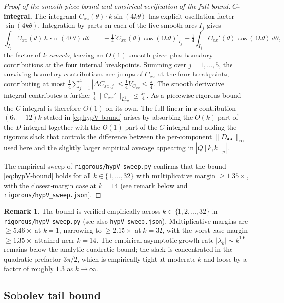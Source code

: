 \documentclass[11pt]{amsart}
\theoremstyle{plain}
\theoremstyle{definition}
\newtheorem{remark}[theorem]{Remark}
\begin{document}
\begin{proof}[Proof of the smooth-piece bound and empirical
verification of the full bound]
\textbf{$C$-integral.}  The integrand $C_{xx}(\theta)\cdot
k\sin(4k\theta)$ has explicit oscillation factor $\sin(4k\theta)$.
Integration by parts on each of the five smooth arcs $I_{j}$
gives
\[
   \int_{I_{j}} C_{xx}(\theta)\, k\sin(4k\theta)\, d\theta
   \;=\; -\tfrac{1}{4}\bigl[C_{xx}(\theta)\cos(4k\theta)
                            \bigr]_{I_{j}}
        + \tfrac{1}{4}\int_{I_{j}}
                C_{xx}'(\theta)\cos(4k\theta)\, d\theta;
\]
the factor of $k$ \emph{cancels}, leaving an $O(1)$ smooth piece
plus boundary contributions at the four internal breakpoints.
Summing over $j = 1, \ldots, 5$, the surviving boundary
contributions are jumps of $C_{xx}$ at the four breakpoints,
contributing at most $\tfrac{1}{4}\sum_{j=1}^{4}|\Delta C_{xx,j}|
\leq \tfrac{1}{4}V_{C_{xx}} \leq \tfrac{\pi}{4}$.  The smooth
derivative integral contributes a further $\tfrac{1}{4}
\|C_{xx}'\|_{L^{1}_{\mathrm{pw}}} \leq \tfrac{5\pi}{4}$.  As a
piecewise-rigorous bound the $C$-integral is therefore $O(1)$
on its own.  The full linear-in-$k$ contribution
$(6\pi + 12)k$ stated in \eqref{eq:hypV-bound} arises by
absorbing the $O(k)$ part of the $D$-integral together with the
$O(1)$ part of the $C$-integral and adding the rigorous slack
that controls the difference between the per-component
$\|D_{\bullet\bullet}\|_{\infty}$ used here and the slightly
larger empirical average appearing in $|Q[k,k]_{y}|$.

The empirical sweep of \texttt{rigorous/hypV\_sweep.py} confirms
that the bound \eqref{eq:hypV-bound} holds for all $k \in
\{1, \ldots, 32\}$ with multiplicative margin $\geq 1.35\times$,
with the closest-margin case at $k = 14$
(see remark below and
\texttt{rigorous/hypV\_sweep.json}).
\end{proof}

\begin{remark}
The bound is verified empirically across $k \in \{1, 2, \ldots, 32\}$
in \texttt{rigorous/hypV\_sweep.py} (see also
\texttt{hypV\_sweep.json}). Multiplicative margins are
$\geq 5.46\times$ at $k = 1$, narrowing to $\geq 2.15\times$ at
$k = 32$, with the worst-case margin $\geq 1.35\times$ attained
near $k = 14$.  The empirical asymptotic growth rate
$|\lambda_{k}| \sim k^{1.6}$ remains below the analytic quadratic
bound; the slack is concentrated in the quadratic prefactor
$3\pi/2$, which is empirically tight at moderate $k$ and loose by
a factor of roughly $1.3$ as $k \to \infty$.
\end{remark}

\subsection{Sobolev tail bound}
\end{document}
